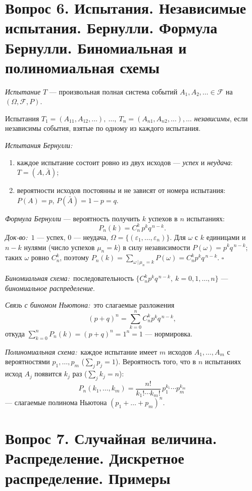 \section*{Вопрос 6. Испытания. Независимые испытания. Бернулли. Формула Бернулли. Биномиальная и полиномиальная схемы}

\textit{Испытание} $T$ — произвольная полная система событий $A_1,A_2,\dots\in\mathcal{F}$ на $(\Omega,\mathcal{F},P)$.

Испытания $T_1=(A_{11},A_{12},\dots),\ \dots,\ T_n=(A_{n1},A_{n2},\dots),\dots$ \textit{независимы}, если независимы события, взятые по одному из каждого испытания.

\textit{Испытания Бернулли:}
\begin{enumerate}
  \item каждое испытание состоит ровно из двух исходов — \textit{успех} и \textit{неудача}: $T=(A,\bar A)$;
  \item вероятности исходов постоянны и не зависят от номера испытания: $P(A)=p$, $P(\bar A)=1-p=q$.
\end{enumerate}

\textit{Формула Бернулли} — вероятность получить $k$ успехов в $n$ испытаниях:
\[ P_n(k)=C_n^k\,p^k q^{\,n-k}. \]
\textit{Док-во:}\ $1$ — успех, $0$ — неудача, $\Omega=\{(\varepsilon_1,\dots,\varepsilon_n)\}$. Для $\omega$ с $k$ единицами и $n-k$ нулями (число успехов $\mu_n=k$) в силу независимости $P(\omega)=p^k q^{\,n-k}$; таких $\omega$ ровно $C_n^k$, поэтому $P_n(k)=\sum_{\omega\,|\,\mu_n=k}P(\omega)=C_n^k p^k q^{\,n-k}$. \hfill$\square$

\textit{Биномиальная схема:}\ последовательность $\{C_n^k p^k q^{\,n-k},\ k=0,1,\dots,n\}$ — \textit{биномиальное распределение}.

\textit{Связь с биномом Ньютона:}\ это слагаемые разложения
\[ (p+q)^n=\sum_{k=0}^{n}C_n^k p^k q^{\,n-k}, \]
откуда $\sum_{k=0}^{n}P_n(k)=(p+q)^n=1^n=1$ — нормировка.

\textit{Полиномиальная схема:}\ каждое испытание имеет $m$ исходов $A_1,\dots,A_m$ с вероятностями $p_1,\dots,p_m$ ($\sum_j p_j=1$). Вероятность того, что в $n$ испытаниях исход $A_j$ появится $k_j$ раз ($\sum_j k_j=n$):
\[ P_n(k_1,\dots,k_m)=\frac{n!}{k_1!\cdots k_m!}\,p_1^{k_1}\cdots p_m^{k_m} \]
— слагаемые полинома Ньютона $(p_1+\dots+p_m)^n$.

\section*{Вопрос 7. Случайная величина. Распределение. Дискретное распределение. Примеры}


